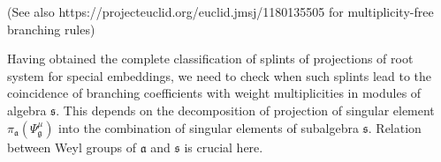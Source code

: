 \documentclass{article}
\newcommand{\gf}{\mathfrak{g}}
\newcommand{\af}{\mathfrak{a}}
\newcommand{\sfr}{\mathfrak{s}}
\begin{document}
(See also https://projecteuclid.org/euclid.jmsj/1180135505 for multiplicity-free branching rules)

Having obtained the complete classification of splints of projections of root system for special
embeddings, we need to check when such splints lead to the coincidence of branching coefficients
with weight multiplicities in modules of algebra $\sfr$. This depends on the decomposition of
projection of singular element $\pi_{\af}\left(\Psi^{\mu}_{\gf}\right)$ into the combination of
singular elements of subalgebra $\sfr$. Relation between Weyl groups of $\af$ and $\sfr$ is crucial
here. 
\end{document}
